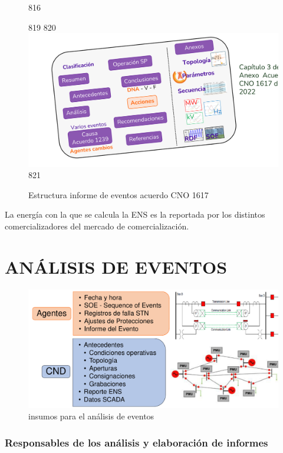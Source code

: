 \documentclass[a5paper]{book}%
\begin{document}
\begin{figure}[H]
 816      \caption{Estructura informe de eventos acuerdo CNO 1617}
 819   \label{fig:estructurainforme}
 820   \includegraphics[width=\linewidth]{estructura_informe_eventos1617}
 821 \end{figure}


La energía con la que se calcula la \ac{ENS} es la reportada por los distintos comercializadores del mercado de comercialización.

  \section{ANÁLISIS DE EVENTOS}



\begin{figure}[H]
  \centering
  \caption{insumos para el análisis de eventos}
  \label{fig:insumoseventos}
  \includegraphics[width=0.8\linewidth]{insumos_eventos}
\end{figure}

\subsubsection{Responsables de los análisis y elaboración de informes}
\end{document}

